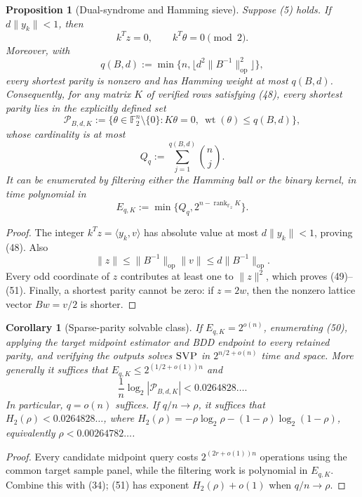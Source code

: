 \documentclass[10pt]{article}
\newtheorem{proposition}[theorem]{Proposition}
\newtheorem{corollary}[theorem]{Corollary}
\theoremstyle{definition}
\newcommand{\F}{\mathbb{F}}
\newcommand{\op}{\mathrm{op}}
\newcommand{\SVP}{\textnormal{\textsc{SVP}}}
\newcommand{\ip}[2]{\langle #1,#2\rangle}
\newcommand{\norm}[1]{\lVert #1\rVert}
\newcommand{\cP}{\mathcal{P}}
\begin{document}
\begin{proposition}[Dual-syndrome and Hamming sieve]              \label{prop:sieve}
Suppose (5) holds.  If $d\norm{y_k}<1$, then
\[
 k^Tz=0,
 \qquad k^T\theta=0\pmod2.                                    \tag{48}
\]
Moreover, with
\[
 q(B,d):=\min\{n,\lfloor d^2\norm{B^{-1}}_{\op}^2\rfloor\},     \tag{49}
\]
every shortest parity is nonzero and has Hamming weight at most $q(B,d)$.
Consequently, for any matrix $K$ of verified rows satisfying (48), every
shortest parity lies in the explicitly defined set
\[
 \cP_{B,d,K}:=\{\theta\in\F_2^n\setminus\{0\}:
 K\theta=0,\ \operatorname{wt}(\theta)\le q(B,d)\},             \tag{50}
\]
whose cardinality is at most
\[
 Q_q:=\sum_{j=1}^{q(B,d)}\binom nj.                             \tag{51}
\]
It can be enumerated by filtering either the Hamming ball or the binary
kernel, in time polynomial in
\[
 E_{q,K}:=\min\{Q_q,2^{n-\operatorname{rank}_{\F_2}K}\}.         \tag{51a}
\]
\end{proposition}

\begin{proof}
The integer $k^Tz=\ip{y_k}{v}$ has absolute value at most
$d\norm{y_k}<1$, proving (48).  Also
\[
 \norm z\le\norm{B^{-1}}_{\op}\norm v
 \le d\norm{B^{-1}}_{\op}.
\]
Every odd coordinate of $z$ contributes at least one to $\norm z^2$, which
proves (49)--(51).  Finally, a shortest parity cannot be zero: if $z=2w$,
then the nonzero lattice vector $Bw=v/2$ is shorter.
\end{proof}

\begin{corollary}[Sparse-parity solvable class]                  \label{cor:sieve}
If $E_{q,K}=2^{o(n)}$, enumerating (50), applying the target midpoint
estimator and BDD endpoint to every retained parity, and verifying the
outputs solves $\SVP$ in $2^{n/2+o(n)}$ time and space.  More generally it
suffices that $E_{q,K}\le2^{(1/2+o(1))n}$ and
\[
 \frac1n\log_2|\cP_{B,d,K}|<0.0264828\ldots.                    \tag{52}
\]
In particular, $q=o(n)$ suffices.  If $q/n\to\rho$, it suffices that
$H_2(\rho)<0.0264828\ldots$, where
$H_2(\rho)=-\rho\log_2\rho-(1-\rho)\log_2(1-\rho)$, equivalently
$\rho<0.00264782\ldots$.
\end{corollary}

\begin{proof}
Every candidate midpoint query costs $2^{(2r+o(1))n}$ operations using the
common target sample panel, while the filtering work is polynomial in
$E_{q,K}$.  Combine this with (34); (51) has exponent
$H_2(\rho)+o(1)$ when $q/n\to\rho$.
\end{proof}
\end{document}
